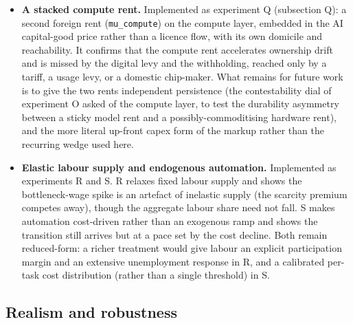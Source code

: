 \documentclass[11pt]{article}
\begin{document}
\begin{itemize}
  than a calibrated value.
\item
  \textbf{A stacked compute rent.} Implemented as experiment Q
  (subsection Q): a second foreign rent (\texttt{mu\_compute}) on the
  compute layer, embedded in the AI capital-good price rather than a
  licence flow, with its own domicile and reachability. It confirms that
  the compute rent accelerates ownership drift and is missed by the
  digital levy and the withholding, reached only by a tariff, a usage
  levy, or a domestic chip-maker. What remains for future work is to give
  the two rents independent persistence (the contestability dial of
  experiment O asked of the compute layer, to test the durability
  asymmetry between a sticky model rent and a possibly-commoditising
  hardware rent), and the more literal up-front capex form of the markup
  rather than the recurring wedge used here.
\item
  \textbf{Elastic labour supply and endogenous automation.} Implemented
  as experiments R and S. R relaxes fixed labour supply and shows the
  bottleneck-wage spike is an artefact of inelastic supply (the
  scarcity premium competes away), though the aggregate labour share
  need not fall. S makes automation cost-driven rather than an exogenous
  ramp and shows the transition still arrives but at a pace set by the
  cost decline. Both remain reduced-form: a richer treatment would give
  labour an explicit participation margin and an extensive
  unemployment response in R, and a calibrated per-task cost
  distribution (rather than a single threshold) in S.
\end{itemize}

\hypertarget{realism-and-robustness}{%
\subsection{Realism and robustness}\label{realism-and-robustness}}
\end{document}
